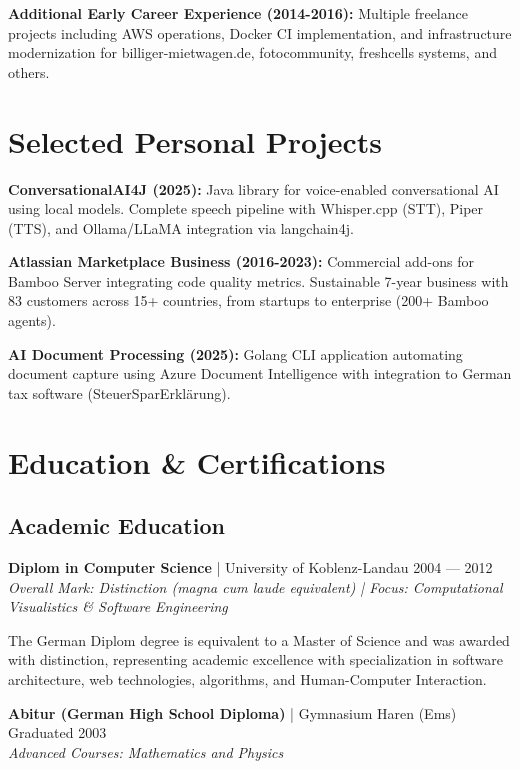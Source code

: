 \documentclass[10pt,a4paper]{article}
\begin{document}
\textbf{Additional Early Career Experience (2014-2016):} Multiple freelance projects including AWS operations, Docker CI implementation, and infrastructure modernization for billiger-mietwagen.de, fotocommunity, freshcells systems, and others.

\vspace{6pt}

\section{Selected Personal Projects}

\textbf{ConversationalAI4J (2025):} Java library for voice-enabled conversational AI using local models. Complete speech pipeline with Whisper.cpp (STT), Piper (TTS), and Ollama/LLaMA integration via langchain4j.

\textbf{Atlassian Marketplace Business (2016-2023):} Commercial add-ons for Bamboo Server integrating code quality metrics. Sustainable 7-year business with 83 customers across 15+ countries, from startups to enterprise (200+ Bamboo agents).

\textbf{AI Document Processing (2025):} Golang CLI application automating document capture using Azure Document Intelligence with integration to German tax software (SteuerSparErklärung).

\newpage

\section{Education \& Certifications}

\subsection{Academic Education}

\textbf{Diplom in Computer Science} | University of Koblenz-Landau \hfill 2004 --- 2012 \\
\textit{Overall Mark: Distinction (magna cum laude equivalent) | Focus: Computational Visualistics \& Software Engineering}

The German Diplom degree is equivalent to a Master of Science and was awarded with distinction, representing academic excellence with specialization in software architecture, web technologies, algorithms, and Human-Computer Interaction.

\textbf{Abitur (German High School Diploma)} | Gymnasium Haren (Ems) \hfill Graduated 2003 \\
\textit{Advanced Courses: Mathematics and Physics}
\end{document}
